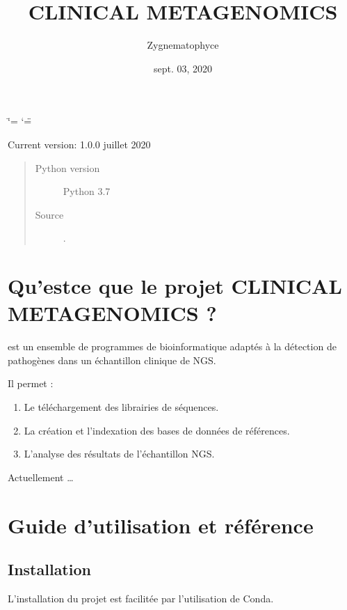 \documentclass[letterpaper,10pt,french]{sphinxmanual}
\title{CLINICAL METAGENOMICS}
\date{sept. 03, 2020}
\author{Zygnematophyce}
\begin{document}
\ifdefined\shorthandoff
  \ifnum\catcode`\=\string=\active\shorthandoff{=}\fi
  \ifnum\catcode`\"=\active{}\fi
\fi

\pagestyle{empty}
\sphinxmaketitle
\pagestyle{plain}
\sphinxtableofcontents
\pagestyle{normal}
\label{\detokenize{index::doc}}


Current version: 1.0.0 juillet 2020
\begin{quote}\begin{description}
\item[{Python version}] \leavevmode
Python 3.7

\item[{Source}] \leavevmode
{}.

\end{description}\end{quote}


\chapter{Qu’est\sphinxhyphen{}ce que le projet CLINICAL METAGENOMICS ?}
\label{\detokenize{index:qu-est-ce-que-le-projet-clinical-metagenomics}}
 est un ensemble de programmes de bio\sphinxhyphen{}informatique adaptés à la détection de pathogènes dans un échantillon clinique de NGS.

Il permet :
\begin{enumerate}
%
\item {} 
Le téléchargement des librairies de séquences.

\item {} 
La création et l’indexation des bases de données de références.

\item {} 
L’analyse des résultats de l’échantillon NGS.

\end{enumerate}

Actuellement …


\chapter{Guide d’utilisation et référence}
\label{\detokenize{index:guide-d-utilisation-et-reference}}

\section{Installation}
\label{\detokenize{installation_conda_environnement:installation}}\label{\detokenize{installation_conda_environnement::doc}}
L’installation du projet est facilitée par l’utilisation de Conda.
\end{document}
